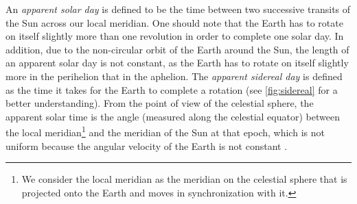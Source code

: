 \documentclass[../main.tex]{subfiles}
\begin{document}
An \emph{apparent solar day} is defined to be the time between two successive transits of the Sun across our local meridian. One should note that the Earth has to rotate on itself slightly more than one revolution in order to complete one solar day. In addition, due to the non-circular orbit of the Earth around the Sun, the length of an apparent solar day is not constant, as the Earth has to rotate on itself slightly more in the perihelion that in the aphelion. The \emph{apparent sidereal day} is defined as the time it takes for the Earth to complete a rotation (see \cref{fig:sidereal} for a better understanding). From the point of view of the celestial sphere, the apparent solar time is the angle (measured along the celestial equator) between the local meridian\footnote{We consider the local meridian as the meridian on the celestial sphere that is projected onto the Earth and moves in synchronization with it.} and the meridian of the Sun at that epoch, which is not uniform because the angular velocity of the Earth is not constant \cite{montenbruck}.
\end{document}

